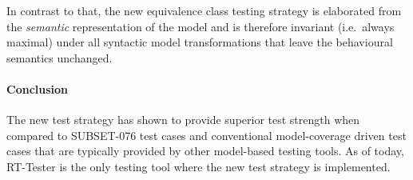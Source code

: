 In contrast to that, the new equivalence class testing strategy is
elaborated from the {\it semantic} representation of the model and is
therefore invariant (i.e.~always maximal) under all syntactic model
transformations that leave the behavioural semantics unchanged.


\paragraph{Conclusion}

The new test strategy has shown to provide superior test strength when
compared to SUBSET-076 test cases and conventional model-coverage
driven test cases that are typically provided by other model-based
testing tools. As of today, RT-Tester is the only testing tool where
the new test strategy is implemented.
